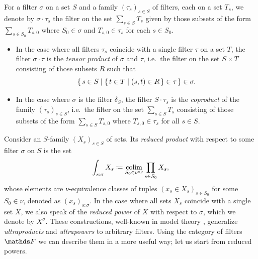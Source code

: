 \begin{cons}
    For a filter $\sigma$ on a set $S$ and a family $(\tau_s)_{s\in S}$ of filters, each on a set $T_s$, we denote by $\sigma \cdot \tau_s$ the filter on the set $\sum_{s\in S}T_s$ given by those subsets of the form $\sum_{s\in S_0} T_{s,0}$ where $S_0 \in \sigma$ and $T_{s,0} \in \tau_s$ for each $s \in S_0$. 
\begin{itemize}
    \item[(a)]In the case where all filters $\tau_s$ coincide with a single filter $\tau$ on a set $T$, the filter $\sigma\cdot \tau$ is the \emph{tensor product} of $\sigma$ and $\tau$, i.e.\ the filter on the set $S \times T$ consisting of those subsets $R$ such that 
    \[ \set{ s\in S | \set{ t \in T | (s,t) \in R } \in \tau } \in \sigma. \]
    \item[(b)]In the case where $\sigma$ is the filter $\delta_S$, the filter $S\cdot \tau_s$ is the \emph{coproduct} of the family $(\tau_s)_{s\in S}$, i.e.\ the filter on the set $\sum_{s\in S}T_s$ consisting of those subsets of the form $\sum_{s\in S} T_{s,0}$ where $T_{s,0} \in \tau_s$ for all $s \in S$.
\end{itemize}
\end{cons}

Consider an $S$-family $(X_s)_{s\in S}$ of sets. Its \emph{reduced product} with respect to some filter $\sigma$ on $S$ is the set 
\[ \int_{s:\sigma} X_s \coloneqq \operatorname*{colim}_{ S_0 \in \nu^{\mathrm{op}}} \prod_{s\in S_0} X_s,\]
whose elements are $\nu$-equivalence classes of tuples $(x_s \in X_s)_{s\in S_0}$ for some $S_0 \in \nu$, denoted as $(x_s)_{s:\sigma}$. In the case where all sets $X_s$ coincide with a single set $X$, we also speak of the \emph{reduced power} of $X$ with respect to $\sigma$, which we denote by $X^\sigma$. These constructions, well-known in model theory \cite{?}, generalize \emph{ultraproducts} and \emph{ultrapowers} to arbitrary filters. Using the category of filters $\FF$ we can describe them in a more useful way; let us start from reduced powers.

